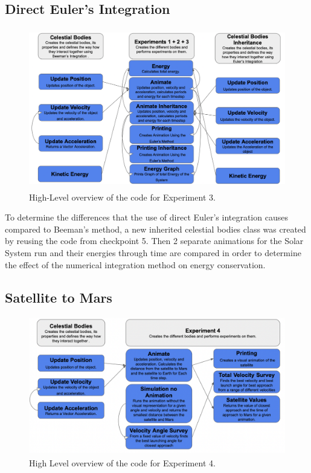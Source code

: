 \documentclass{article}
\begin{document}
\subsection{Direct Euler's Integration}
\begin{figure}[H]
    \centering
    \includegraphics[width=11.856cm, height=7.008cm]{Experiment 3.png}
    \caption{High-Level overview of the code for Experiment 3.}
    \label{fig:my_label}
\end{figure}
{To determine the differences that the use of direct Euler's integration causes compared to Beeman's method, a new inherited celestial bodies class was created by reusing the code from checkpoint 5. Then 2 separate animations for the Solar System run and their energies through time are compared in order to determine the effect of the numerical integration method on energy conservation. }
\subsection{Satellite to Mars}

\begin{figure}[H]
    \centering
    \includegraphics[width=11.412cm, height=6.024cm]{Experiment 4.png}
    \caption{High Level overview of the code for Experiment 4.}
    \label{fig:my_label}
\end{figure}
\end{document}

